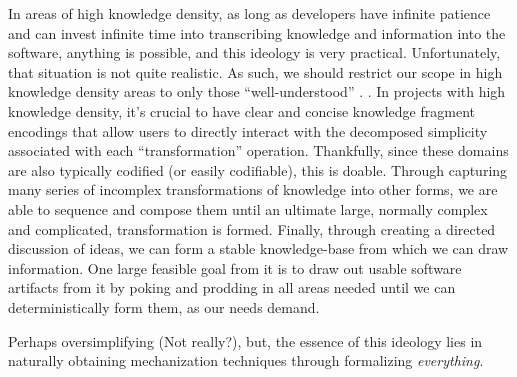 In areas of high knowledge density, as long as developers have infinite patience
and can invest infinite time into transcribing knowledge and information into
the software, anything is possible, and this ideology is very practical.
Unfortunately, that situation is not quite realistic. As such, we should
restrict our scope in high knowledge density areas to only those
``well-understood'' \cite{well-understood}. . In
projects with high knowledge density, it's crucial to have clear and concise
knowledge fragment encodings that allow users to directly interact with the
decomposed simplicity associated with each ``transformation'' operation.
Thankfully, since these domains are also typically codified (or easily
codifiable), this is doable. Through capturing many series of incomplex
transformations of knowledge into other forms, we are able to sequence and
compose them until an ultimate large, normally complex and complicated,
transformation is formed. Finally, through creating a directed discussion of
ideas, we can form a stable knowledge-base from which we can draw information.
One large feasible goal from it is to draw out usable software artifacts from it
by poking and prodding in all areas needed until we can deterministically form
them, as our needs demand.

Perhaps oversimplifying (Not really?), but, the essence of this ideology lies in
naturally obtaining mechanization techniques through formalizing
\textit{everything}.
